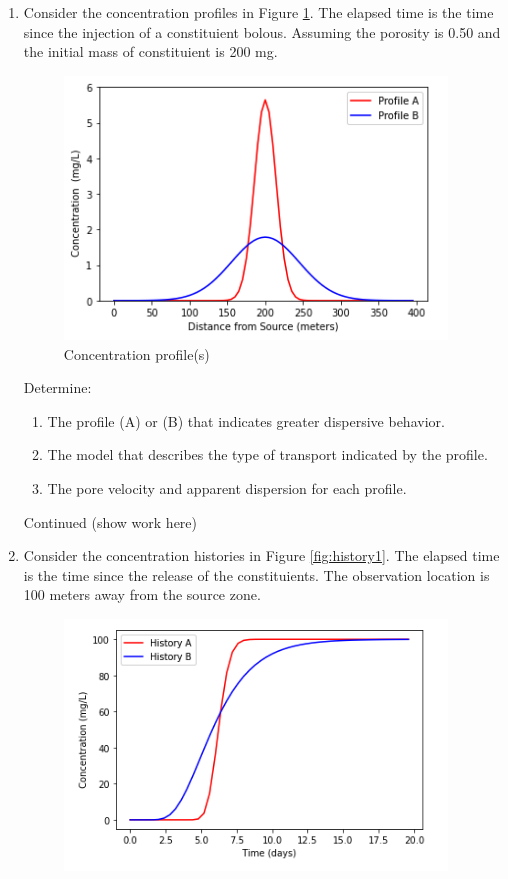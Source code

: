 \documentclass[12pt]{article}
\begin{document}
\begin{enumerate}
\clearpage
\item  Consider the concentration profiles in Figure \ref{fig:profile1}.  The elapsed time is the time since the injection of a constituient bolous.  Assuming the porosity is 0.50 and the initial mass of constituient is 200 mg.
\begin{figure}[h!] %
   \centering
   \includegraphics[width=4in]{profile1.png} 
   \caption{Concentration profile(s)}
   \label{fig:profile1}
\end{figure}
Determine:
\begin{enumerate}
\item The profile (A) or (B) that indicates greater dispersive behavior.
\item The model that describes the type of transport indicated by the profile.
\item The pore velocity and apparent dispersion for each profile.
\end{enumerate}
\clearpage
Continued (show work here)
\clearpage
\item  Consider the concentration histories in Figure \ref{fig:history1}.  The elapsed time is the time since the release of the constituients. The observation location is 100 meters away from the source zone. 
\begin{figure}[h!] %
   \centering
   \includegraphics[width=4in]{history1.png} 

\end{figure}
\end{enumerate}
\end{document}
